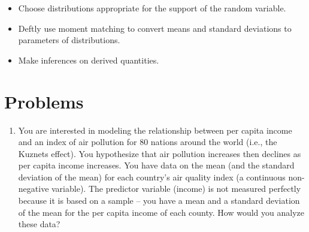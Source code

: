 \documentclass[12pt, oneside]{article}
\begin{document}
\begin{itemize}
\item Choose distributions appropriate for the support of the random variable.
\item Deftly use moment matching to convert means and standard deviations to parameters of distributions.
\item Make inferences on derived quantities.
\end{itemize}

\section*{Problems}

\begin{enumerate}[leftmargin=*]

\item You are interested in modeling the relationship between per capita income and an index of air pollution for 80 nations around the world (i.e., the Kuznets effect). You hypothesize that air pollution increases then declines as per capita income increases. You have data on the mean (and the standard deviation of the mean) for each country's air quality index (a continuous non-negative variable). The predictor variable (income) is not measured perfectly because it is based on a sample -- you have a mean and a standard deviation of the mean for the per capita income of each county. How would you analyze these data?


\end{enumerate}
\end{document}
